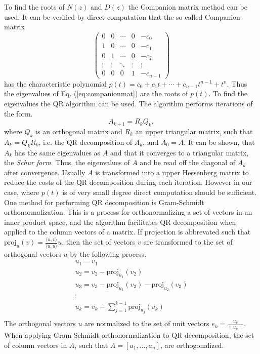 \documentclass{article}
\begin{document}
To find the roots of $N(z)$ and $D(z)$ the Companion matrix method can be used. It can be verified by direct computation that the so called Companion matrix
\begin{equation}
\label{eq:companionmat}
\left(\begin{array}{ccccc}0 & 0 & \cdots & 0 & -c_0 \\1 & 0 & \cdots & 0 & -c_1 \\0 & 1 & \cdots & 0 & -c_2 \\\vdots & \vdots & \ddots & \vdots & \vdots \\0 & 0 & 0 & 1 & -c_{n-1}\end{array}\right)
\end{equation}
has the characteristic polynomial $p(t)=c_0+c_1 t + \cdots + c_{n-1} t^{n-1} + t^n$. Thus the eigenvalues of Eq. (\ref{eq:companionmat}) are the roots of $p(t)$. To find the eigenvalues the QR algorithm can  be used. The algorithm performs iterations of the form. 
$$A_{k+1} = R_{k} Q_{k},$$ 
where $Q_k$ is an orthogonal matrix and $R_k$ an upper triangular matrix, such that $A_k = Q_k R_k$, i.e. the QR decomposition of $A_k$, and $A_0=A$. It can be shown, that $A_k$ has the same eigenvalues as $A$ and that it converges to a triangular matrix, the {\it Schur form}.  Thus, the eigenvalues of $A$ and be read off the diagonal of $A_k$ after convergence. Usually $A$ is transformed into a upper Hessenberg matrix to reduce the costs of the QR decomposition during each iteration. However in our case, where $p(t)$ is of very small degree direct computation should be sufficient. One method for performing QR decomposition is Gram-Schmidt orthonormalization. This is a process for orthonormalizing a set of vectors in an inner product space, and the algorithm facilitates QR decomposition when applied to the column vectors of a matrix. If projection is abbrevated such that $\mathrm{proj}_u(v)=\frac{\langle u,v \rangle}{\langle u,u \rangle}u$, then the set of vectors $v$ are transformed to the set of orthogonal vectors $u$ by the following process:
$$\begin{array}{l}
u_1=v_1\\
u_2=v_2-\mathrm{proj}_{u_1}(v_2)\\
u_3=v_3-\mathrm{proj}_{u_1}(v_3)-\mathrm{proj}_{u_2}(v_3)\\
\vdots\\
u_k=v_k-\sum_{j=1}^{k-1}\mathrm{proj}_{u_j}(v_k)\\
\end{array}$$
The orthogonal vectors $u$ are normalized to the set of unit vectors $e_k=\frac{u_k}{\|u_k\|}$. When applying Gram-Schmidt orthonormalization to QR decomposition, the set of column vectors in $A$, such that $A=[a_1,\ldots,a_n]$, are orthogonalized.
\end{document}
